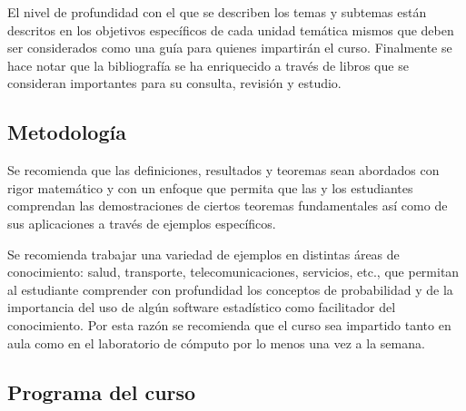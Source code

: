 El nivel de profundidad con el que se describen los temas y subtemas est\'an descritos en los objetivos espec\'ificos de cada unidad tem\'atica mismos que deben ser considerados como una gu\'ia para quienes impartir\'an el curso. Finalmente se hace notar que la bibliograf\'ia se ha enriquecido a trav\'es de libros que se consideran importantes para su consulta, revisi\'on y estudio.


\subsection{Metodolog\'ia}

Se recomienda que las definiciones, resultados y teoremas sean abordados con rigor matem\'atico y con un enfoque que permita que las y los estudiantes comprendan las demostraciones de ciertos teoremas fundamentales as\'i como de sus aplicaciones a trav\'es de ejemplos espec\'ificos.

Se recomienda trabajar una variedad de ejemplos en distintas \'areas de conocimiento: salud, transporte, telecomunicaciones, servicios, etc., que permitan al estudiante comprender con profundidad los conceptos de probabilidad y de la importancia del uso de alg\'un software estad\'istico como facilitador del conocimiento. Por esta raz\'on se recomienda que el curso sea impartido tanto en aula como en el laboratorio de c\'omputo por lo menos una vez a la semana.

\subsection{Programa del curso}

